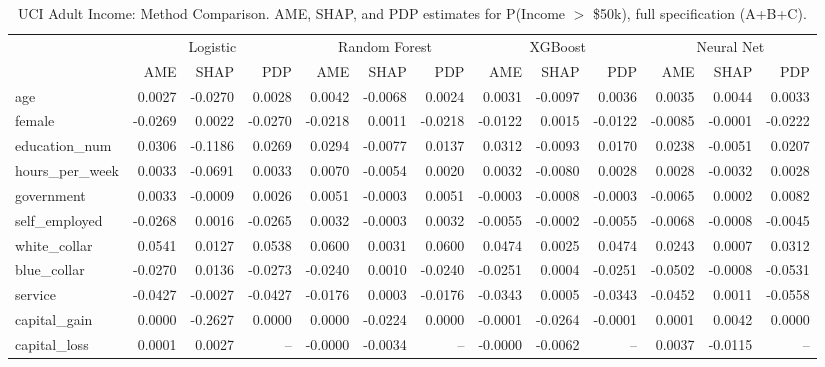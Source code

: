 \documentclass[conference]{IEEEtran}
\begin{document}
	\begin{table}[htbp]
		\centering
		\footnotesize
		\begin{threeparttable}
			\caption{UCI Adult Income: Method Comparison. AME, SHAP, and PDP estimates for P(Income $>$ \$50k), full specification (A+B+C).}
			\label{tab:adult_method_comparison}
			\begin{tabular}{lrrrrrrrrrrrr}
				\toprule
				& \multicolumn{3}{c}{Logistic} & \multicolumn{3}{c}{Random Forest} & \multicolumn{3}{c}{XGBoost} & \multicolumn{3}{c}{Neural Net} \\
				\cmidrule(lr){2-4} \cmidrule(lr){5-7} \cmidrule(lr){8-10} \cmidrule(lr){11-13} 
				& AME & SHAP & PDP & AME & SHAP & PDP & AME & SHAP & PDP & AME & SHAP & PDP \\
				\midrule
				age & 0.0027 & -0.0270 & 0.0028 & 0.0042 & -0.0068 & 0.0024 & 0.0031 & -0.0097 & 0.0036 & 0.0035 & 0.0044 & 0.0033 \\
				female & -0.0269 & 0.0022 & -0.0270 & -0.0218 & 0.0011 & -0.0218 & -0.0122 & 0.0015 & -0.0122 & -0.0085 & -0.0001 & -0.0222 \\
				education\_num & 0.0306 & -0.1186 & 0.0269 & 0.0294 & -0.0077 & 0.0137 & 0.0312 & -0.0093 & 0.0170 & 0.0238 & -0.0051 & 0.0207 \\
				\midrule
				hours\_per\_week & 0.0033 & -0.0691 & 0.0033 & 0.0070 & -0.0054 & 0.0020 & 0.0032 & -0.0080 & 0.0028 & 0.0028 & -0.0032 & 0.0028 \\
				government & 0.0033 & -0.0009 & 0.0026 & 0.0051 & -0.0003 & 0.0051 & -0.0003 & -0.0008 & -0.0003 & -0.0065 & 0.0002 & 0.0082 \\
				self\_employed & -0.0268 & 0.0016 & -0.0265 & 0.0032 & -0.0003 & 0.0032 & -0.0055 & -0.0002 & -0.0055 & -0.0068 & -0.0008 & -0.0045 \\
				white\_collar & 0.0541 & 0.0127 & 0.0538 & 0.0600 & 0.0031 & 0.0600 & 0.0474 & 0.0025 & 0.0474 & 0.0243 & 0.0007 & 0.0312 \\
				blue\_collar & -0.0270 & 0.0136 & -0.0273 & -0.0240 & 0.0010 & -0.0240 & -0.0251 & 0.0004 & -0.0251 & -0.0502 & -0.0008 & -0.0531 \\
				service & -0.0427 & -0.0027 & -0.0427 & -0.0176 & 0.0003 & -0.0176 & -0.0343 & 0.0005 & -0.0343 & -0.0452 & 0.0011 & -0.0558 \\
				\midrule
				capital\_gain & 0.0000 & -0.2627 & 0.0000 & 0.0000 & -0.0224 & 0.0000 & -0.0001 & -0.0264 & -0.0001 & 0.0001 & 0.0042 & 0.0000 \\
				capital\_loss & 0.0001 & 0.0027 & -- & -0.0000 & -0.0034 & -- & -0.0000 & -0.0062 & -- & 0.0037 & -0.0115 & -- \\

\end{tabular}
\end{threeparttable}
\end{table}
\end{document}
